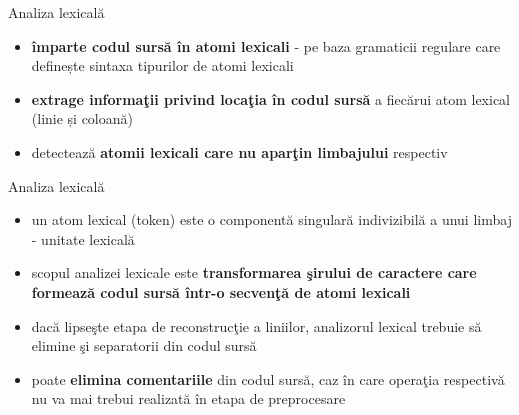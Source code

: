 \documentclass[pdf]{beamer}
\begin{document}
\begin{frame}{Analiza lexicală}
\begin{itemize}
\item
\textbf{împarte codul sursă în atomi lexicali} - pe baza gramaticii regulare care definește sintaxa tipurilor de atomi lexicali
\newline

\item
\textbf{extrage informaţii privind locaţia în codul sursă} a fiecărui atom lexical (linie și coloană)
\newline

\item
detectează \textbf{atomii lexicali care nu aparţin limbajului} respectiv

\end{itemize}
\end{frame}



\begin{frame}{Analiza lexicală}
\begin{itemize}
\item
un atom lexical (token) este o componentă singulară indivizibilă a unui limbaj - unitate lexicală

\item
scopul analizei lexicale este \textbf{transformarea şirului de caractere care formează codul sursă într-o secvenţă de atomi lexicali}

\item
dacă lipseşte etapa de reconstrucţie a liniilor, analizorul lexical trebuie să elimine şi separatorii din codul sursă

\item
poate \textbf{elimina comentariile} din codul sursă, caz în care operaţia respectivă nu va mai trebui realizată în etapa de preprocesare
\end{itemize}
\end{frame}
\end{document}
